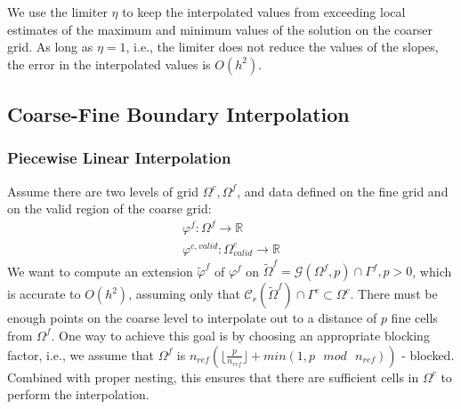 We use the limiter $\eta$ to keep the
interpolated values from exceeding local estimates of the maximum and
minimum values of the solution on the coarser grid. As long as $\eta =
1$, i.e., the limiter does not reduce the values of the slopes, the
error in the interpolated values is $O(h^2)$.


\subsection{Coarse-Fine Boundary Interpolation}

\subsubsection{Piecewise Linear Interpolation \label{sec:pwlB}}

Assume there are two levels of grid $\Omega^c, \Omega^f$, and data
defined on the fine grid and on the valid region of the coarse grid:
\begin{gather*}
\varphi^f: \Omega^f \rightarrow {\mathbb{R}}
\\
\varphi^{c, valid}: \Omega^c_{valid} \rightarrow {\mathbb{R}}
\end{gather*}
We want to compute an extension $\tilde{\varphi}^f$ of $\varphi^f$ on
$\tilde{\Omega}^f = {\mathcal{G}}(\Omega^f, p) \cap \Gamma^f, p > 0$,
which is accurate to
$O(h^2)$, assuming only that
${\mathcal{C}}_r(\tilde{\Omega}^f) \cap \Gamma^c \subset \Omega^c$.
There must be enough points on the
coarse level to interpolate out to a distance of $p$ fine cells from 
$\Omega^f$. One way to achieve this goal is by choosing an appropriate
blocking factor, i.e., we assume that $\Omega^f$ is $n_{ref}(\lfloor
\frac{p}{n_{ref}}\rfloor + min(1,p \mbox{ } mod \mbox{ } n_{ref}))$ - blocked. Combined with proper
nesting, this ensures that there are sufficient cells in $\Omega^c$ to
perform the interpolation.

